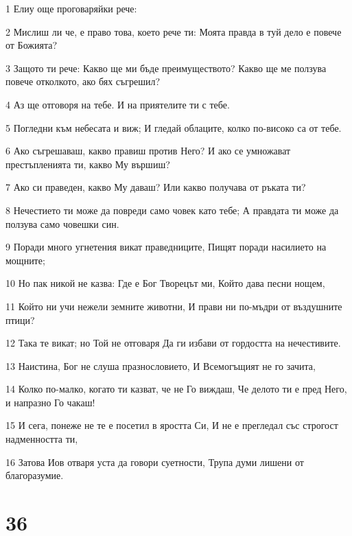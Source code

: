 \par 1 Елиу още проговаряйки рече:
\par 2 Мислиш ли че, е право това, което рече ти: Моята правда в туй дело е повече от Божията?
\par 3 Защото ти рече: Какво ще ми бъде преимуществото? Какво ще ме ползува повече отколкото, ако бях съгрешил?
\par 4 Аз ще отговоря на тебе. И на приятелите ти с тебе.
\par 5 Погледни към небесата и виж; И гледай облаците, колко по-високо са от тебе.
\par 6 Ако съгрешаваш, какво правиш против Него? И ако се умножават престъпленията ти, какво Му вършиш?
\par 7 Ако си праведен, какво Му даваш? Или какво получава от ръката ти?
\par 8 Нечестието ти може да повреди само човек като тебе; А правдата ти може да ползува само човешки син.
\par 9 Поради много угнетения викат праведниците, Пищят поради насилието на мощните;
\par 10 Но пак никой не казва: Где е Бог Творецът ми, Който дава песни нощем,
\par 11 Който ни учи нежели земните животни, И прави ни по-мъдри от въздушните птици?
\par 12 Така те викат; но Той не отговаря Да ги избави от гордостта на нечестивите.
\par 13 Наистина, Бог не слуша празнословието, И Всемогъщият не го зачита,
\par 14 Колко по-малко, когато ти казват, че не Го виждаш, Че делото ти е пред Него, и напразно Го чакаш!
\par 15 И сега, понеже не те е посетил в яростта Си, И не е прегледал със строгост надменността ти,
\par 16 Затова Иов отваря уста да говори суетности, Трупа думи лишени от благоразумие.

\chapter{36}

